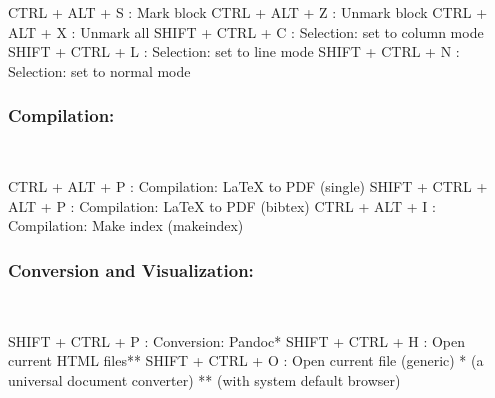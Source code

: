 \vspace{-0.5cm}
\begin{Rtables}[caption={[Selection keyboard shortcuts]
    Selection keyboard shortcuts},
  label=hotkey:selection]
  CTRL  + ALT  + S : Mark block
  CTRL  + ALT  + Z : Unmark block
  CTRL  + ALT  + X : Unmark all
  SHIFT + CTRL + C : Selection: set to column mode
  SHIFT + CTRL + L : Selection: set to line mode
  SHIFT + CTRL + N : Selection: set to normal mode
\end{Rtables}


\subsubsection{Compilation:}\\

\vspace{-0.5cm}
\begin{Rtables}[caption={[Compilation keyboard shortcuts]
    Compilation keyboard shortcuts},
  label=hotkey:compilation]
  CTRL  + ALT  + P       : Compilation: LaTeX to PDF (single)
  SHIFT + CTRL + ALT + P : Compilation: LaTeX to PDF (bibtex)
  CTRL  + ALT  + I       : Compilation: Make index (makeindex)
\end{Rtables}


\subsubsection{Conversion and Visualization:}\\

\vspace{-0.5cm}
\begin{Rtables}[caption={[Conversion and visualization keyboard shortcuts]
    Conversion and visualization keyboard shortcuts},
  label=hotkey:conversion]
  SHIFT + CTRL + P : Conversion: Pandoc*
  SHIFT + CTRL + H : Open current HTML files**
  SHIFT + CTRL + O : Open current file (generic)
  *  (a universal document converter)
  ** (with system default browser)
\end{Rtables}


